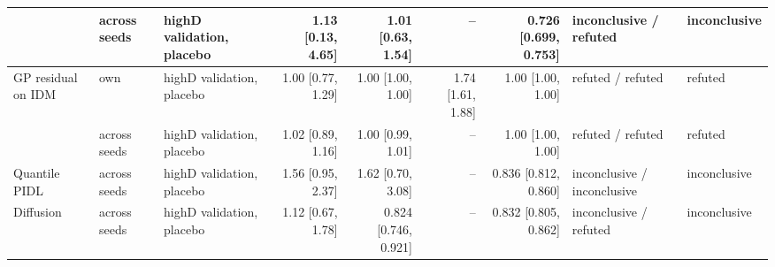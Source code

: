 \begin{table}[htbp]
\begin{tabular}{lllrrrrll}
 & across seeds & highD validation, placebo & 1.13 [0.13, 4.65] & 1.01 [0.63, 1.54] & -- & 0.726 [0.699, 0.753] & inconclusive / refuted & inconclusive \\
\midrule
GP residual on IDM & own & highD validation, placebo & 1.00 [0.77, 1.29] & 1.00 [1.00, 1.00] & 1.74 [1.61, 1.88] & 1.00 [1.00, 1.00] & refuted / refuted & refuted \\
\midrule
 & across seeds & highD validation, placebo & 1.02 [0.89, 1.16] & 1.00 [0.99, 1.01] & -- & 1.00 [1.00, 1.00] & refuted / refuted & refuted \\
\midrule
Quantile PIDL & across seeds & highD validation, placebo & 1.56 [0.95, 2.37] & 1.62 [0.70, 3.08] & -- & 0.836 [0.812, 0.860] & inconclusive / inconclusive & inconclusive \\
\midrule
Diffusion & across seeds & highD validation, placebo & 1.12 [0.67, 1.78] & 0.824 [0.746, 0.921] & -- & 0.832 [0.805, 0.862] & inconclusive / refuted & inconclusive \\
\bottomrule
\end{tabular}
\end{table}
